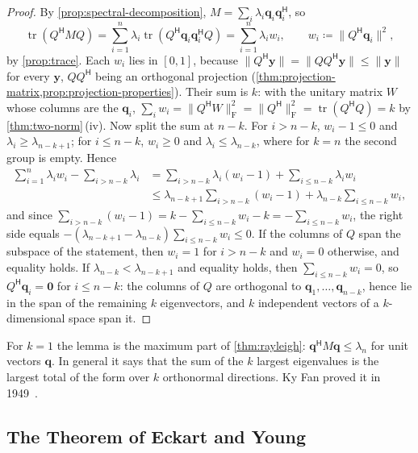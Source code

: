 \begin{proof}
By \cref{prop:spectral-decomposition}, $M=\sum_i\lambda_i\mathbf q_i\mathbf q_i^{\mathsf H}$, so
\[
\operatorname{tr}(Q^{\mathsf H}MQ)=\sum_{i=1}^n\lambda_i\operatorname{tr}(Q^{\mathsf H}\mathbf q_i\mathbf q_i^{\mathsf H}Q)=\sum_{i=1}^n\lambda_iw_i,\qquad w_i\coloneqq\|Q^{\mathsf H}\mathbf q_i\|^2,
\]
by \cref{prop:trace}. Each $w_i$ lies in $[0,1]$, because $\|Q^{\mathsf H}\mathbf y\|=\|QQ^{\mathsf H}\mathbf y\|\le\|\mathbf y\|$ for every $\mathbf y$, $QQ^{\mathsf H}$ being an orthogonal projection (\cref{thm:projection-matrix,prop:projection-properties}). Their sum is $k$: with the unitary matrix $W$ whose columns are the $\mathbf q_i$, $\sum_iw_i=\|Q^{\mathsf H}W\|_{\mathrm F}^2=\|Q^{\mathsf H}\|_{\mathrm F}^2=\operatorname{tr}(Q^{\mathsf H}Q)=k$ by \cref{thm:two-norm}\,(iv). Now split the sum at $n-k$. For $i>n-k$, $w_i-1\le0$ and $\lambda_i\ge\lambda_{n-k+1}$; for $i\le n-k$, $w_i\ge0$ and $\lambda_i\le\lambda_{n-k}$, where for $k=n$ the second group is empty. Hence
\[
\begin{aligned}
\sum_{i=1}^n\lambda_iw_i-\sum_{i>n-k}\lambda_i&=\sum_{i>n-k}\lambda_i(w_i-1)+\sum_{i\le n-k}\lambda_iw_i\\
&\le\lambda_{n-k+1}\sum_{i>n-k}(w_i-1)+\lambda_{n-k}\sum_{i\le n-k}w_i ,
\end{aligned}
\]
and since $\sum_{i>n-k}(w_i-1)=k-\sum_{i\le n-k}w_i-k=-\sum_{i\le n-k}w_i$, the right side equals $-(\lambda_{n-k+1}-\lambda_{n-k})\sum_{i\le n-k}w_i\le0$. If the columns of $Q$ span the subspace of the statement, then $w_i=1$ for $i>n-k$ and $w_i=0$ otherwise, and equality holds. If $\lambda_{n-k}<\lambda_{n-k+1}$ and equality holds, then $\sum_{i\le n-k}w_i=0$, so $Q^{\mathsf H}\mathbf q_i=\mathbf 0$ for $i\le n-k$: the columns of $Q$ are orthogonal to $\mathbf q_1,\ldots,\mathbf q_{n-k}$, hence lie in the span of the remaining $k$ eigenvectors, and $k$ independent vectors of a $k$-dimensional space span it.
\end{proof}

For $k=1$ the lemma is the maximum part of \cref{thm:rayleigh}: $\mathbf q^{\mathsf H}M\mathbf q\le\lambda_n$ for unit vectors $\mathbf q$. In general it says that the sum of the $k$ largest eigenvalues is the largest total of the form over $k$ orthonormal directions. Ky Fan proved it in 1949~\cite{fan1949}.

\subsection{The Theorem of Eckart and Young}

